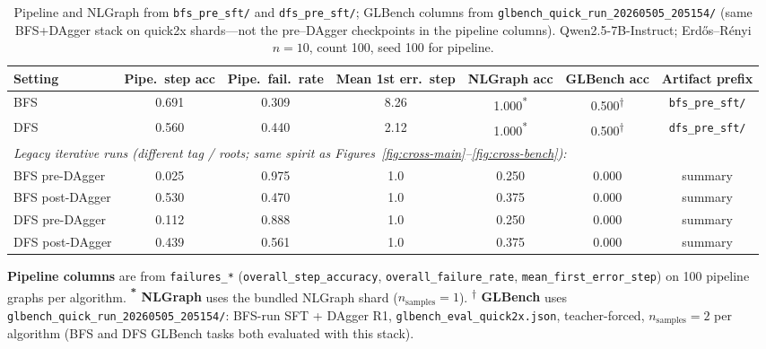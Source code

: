 \documentclass[sigplan,screen]{acmart}
\begin{document}
\begin{table}[t]
  \centering
  \caption{Pipeline and NLGraph from \texttt{bfs\_pre\_sft/} and \texttt{dfs\_pre\_sft/}; GLBench columns from \texttt{glbench\_quick\_run\_20260505\_205154/} (same BFS+DAgger stack on quick2x shards---not the pre--DAgger checkpoints in the pipeline columns). Qwen2.5-7B-Instruct; Erd\H{o}s--R\'enyi $n{=}10$, count 100, seed 100 for pipeline.}
  \label{tab:core}
  \begin{tabular}{lcccccc}
    \toprule
    Setting & Pipe.\ step acc & Pipe.\ fail.\ rate & Mean 1st err.\ step & NLGraph acc & GLBench acc & Artifact prefix \\
    \midrule
    BFS & 0.691 & 0.309 & 8.26 & 1.000\textsuperscript{*} & 0.500\textsuperscript{$\dagger$} & \texttt{bfs\_pre\_sft/} \\
    DFS & 0.560 & 0.440 & 2.12 & 1.000\textsuperscript{*} & 0.500\textsuperscript{$\dagger$} & \texttt{dfs\_pre\_sft/} \\
    \midrule
    \multicolumn{7}{l}{\emph{Legacy iterative runs (different tag / roots; same spirit as Figures~\ref{fig:cross-main}--\ref{fig:cross-bench}):}} \\
    BFS pre-DAgger & 0.025 & 0.975 & 1.0 & 0.250 & 0.000 & summary \\
    BFS post-DAgger & 0.530 & 0.470 & 1.0 & 0.375 & 0.000 & summary \\
    DFS pre-DAgger & 0.112 & 0.888 & 1.0 & 0.250 & 0.000 & summary \\
    DFS post-DAgger & 0.439 & 0.561 & 1.0 & 0.375 & 0.000 & summary \\
    \bottomrule
  \end{tabular}
  \vspace{4pt}
  \begin{minipage}{\linewidth}
  \footnotesize
  \textbf{Pipeline columns} are from \texttt{failures\_*} (\texttt{overall\_step\_accuracy}, \texttt{overall\_failure\_rate}, \texttt{mean\_first\_error\_step}) on 100 pipeline graphs per algorithm.
  \textbf{\textsuperscript{*} NLGraph} uses the bundled NLGraph shard ($n_{\mathrm{samples}}{=}1$).
  \textbf{\textsuperscript{$\dagger$} GLBench} uses \texttt{glbench\_quick\_run\_20260505\_205154/}: BFS-run SFT + DAgger R1, \texttt{glbench\_eval\_quick2x.json}, teacher-forced, $n_{\mathrm{samples}}{=}2$ per algorithm (BFS and DFS GLBench tasks both evaluated with this stack).
  \end{minipage}
\end{table}
\end{document}

